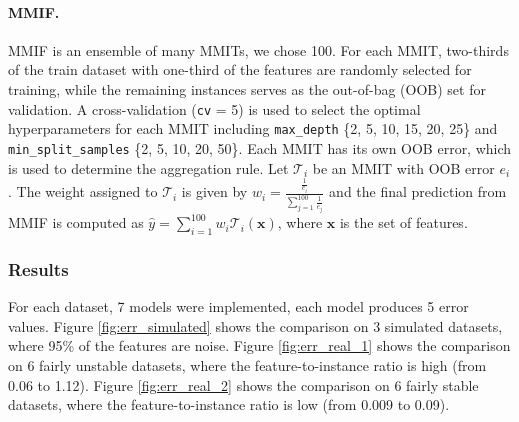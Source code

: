 \documentclass[12pt]{article}
\begin{document}
\paragraph{MMIF.}  
MMIF is an ensemble of many MMITs, we chose 100.
For each MMIT, two-thirds of the train dataset with one-third of the features are randomly selected for training, while the remaining instances serves as the out-of-bag (OOB) set for validation. 
A cross-validation (\texttt{cv} = 5) is used to select the optimal hyperparameters for each MMIT including \texttt{max\_depth} \{2, 5, 10, 15, 20, 25\} and \texttt{min\_split\_samples} \{2, 5, 10, 20, 50\}.
Each MMIT has its own OOB error, which is used to determine the aggregation rule.
Let \(\mathcal{T}_i\) be an MMIT with OOB error \(e_i\). 
The weight assigned to \(\mathcal{T}_i\) is given by
$w_i = \frac{\frac{1}{e_i}}{\sum_{j=1}^{100} \frac{1}{e_j}}$
and the final prediction from MMIF is computed as $\hat{y} = \sum_{i=1}^{100} w_i \mathcal{T}_i(\mathbf{x})$,
where $\mathbf{x}$ is the set of features. 

\subsubsection{Results}
For each dataset, 7 models were implemented, each model produces 5 error values.
Figure \ref{fig:err_simulated} shows the comparison on 3 simulated datasets, where 95\% of the features are noise.
Figure \ref{fig:err_real_1} shows the comparison on 6 fairly unstable datasets, where the feature-to-instance ratio is high (from 0.06 to 1.12).
Figure \ref{fig:err_real_2} shows the comparison on 6 fairly stable datasets, where the feature-to-instance ratio is low (from 0.009 to 0.09).
\end{document}
